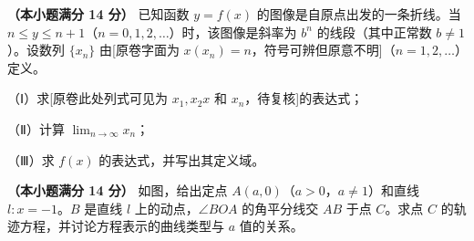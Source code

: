 \begin{question}
\textbf{（本小题满分 14 分）} 已知函数 $y=f(x)$ 的图像是自原点出发的一条折线。当 $n\leq y\leq n+1$（$n=0,1,2,\ldots$）时，该图像是斜率为 $b^n$ 的线段（其中正常数 $b\ne1$）。设数列 $\{x_n\}$ 由[原卷字面为 $x(x_n)=n$，符号可辨但原意不明]（$n=1,2,\ldots$）定义。

（Ⅰ）求[原卷此处列式可见为 $x_1,x_2x$ 和 $x_n$，待复核]的表达式；

（Ⅱ）计算 $\displaystyle\lim_{n\to\infty}x_n$；

（Ⅲ）求 $f(x)$ 的表达式，并写出其定义域。

\Needspace{0.4\textheight}
\end{question}
\begingroup
\renewenvironment{question}{\Needspace{0.05\textheight}}{}
\begin{question}
\textbf{（本小题满分 14 分）} 如图，给出定点 $A(a,0)$（$a>0$，$a\ne1$）和直线 $l:x=-1$。$B$ 是直线 $l$ 上的动点，$\angle BOA$ 的角平分线交 $AB$ 于点 $C$。求点 $C$ 的轨迹方程，并讨论方程表示的曲线类型与 $a$ 值的关系。
\nopagebreak[4]
\begin{center}\end{center}
\nopagebreak[4]

\end{question}
\endgroup